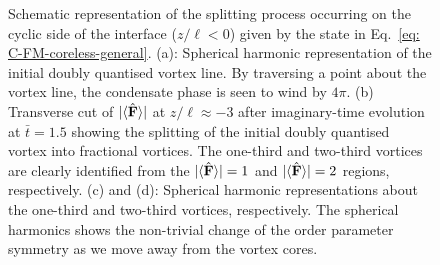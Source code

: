 \begin{figure}
    \caption[Dynamics of the doubly quantised vortex connection in a cyclic to a
        ferromagnetic interface]
    {\label{fig: C-FM-coreless-cyclic}Schematic representation of the
        splitting process occurring on the cyclic side of the interface
        (\(z/\ell < 0\)) given by the state in
        Eq.~\eqref{eq: C-FM-coreless-general}.
        (a): Spherical harmonic representation of the initial doubly quantised
        vortex line. By traversing a point about the vortex line, the condensate
        phase is seen to wind by \(4\pi \).
        (b) Transverse cut of \(|\langle \hat{\vb{F}} \rangle | \) at \(z/\ell \approx -3\) after
        imaginary-time evolution at \(\bar{t} = 1.5\) showing the splitting of
        the initial doubly quantised vortex into fractional vortices.
        The one-third and two-third vortices are clearly identified from the
        \(|\langle \hat{\vb{F}} \rangle | = 1\) and \(|\langle \hat{\vb{F}} \rangle | = 2\) regions, respectively.
        (c) and (d): Spherical harmonic representations about the one-third and
        two-third vortices, respectively.
        The spherical harmonics shows the non-trivial change of the order
        parameter symmetry as we move away from the vortex cores.}
\end{figure}
